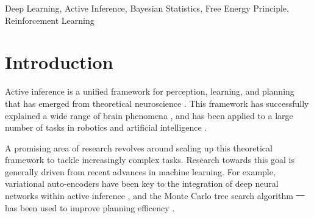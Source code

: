 \documentclass[twoside,11pt]{article}
\providecommand{\DIFadd}[1]{{\protect\color{blue}\uwave{#1}}} %
\providecommand{\DIFdel}[1]{{\protect\color{red}\sout{#1}}}                      %
\providecommand{\DIFaddbegin}{} %
\providecommand{\DIFaddend}{} %
\providecommand{\DIFdelbegin}{} %
\providecommand{\DIFdelend}{} %
\begin{document}
\begin{keywords}
Deep Learning, Active Inference, Bayesian Statistics, Free Energy Principle, Reinforcement Learning
\end{keywords}

\section{Introduction}

Active inference is a unified framework for perception, learning, and planning that has emerged from theoretical neuroscience \citep{AI_TUTO,AI_VMP,AITs_tHEORY,
AITS_PRACTICE,BTAI_BF}. This framework has successfully explained a wide range of brain phenomena  \citep{FRISTON2016862,bayes_surprise,curiosity,dopamine}, and has been applied to a large number of tasks in robotics and artificial intelligence \citep{DeepAIwithMCMC,pezzato2020active,
sancaktar2020endtoend,ccatal2020learning,CULLEN2018809,cart_pole}.

A promising area of research revolves around scaling up this theoretical framework to tackle increasingly complex tasks. Research towards this goal is generally driven from recent advances in machine learning. For example, variational auto-encoders \citep{VAE,beta-VAE} have been key to the integration of deep neural networks within active inference \citep{sancaktar2020endtoend,ccatal2020learning,DeepAI}, and the Monte Carlo tree search algorithm \DIFdelbegin \DIFdel{\mbox{%
\citep{6145622,Go} }\hspace{0pt}%
}\DIFdelend \DIFaddbegin \DIFadd{\mbox{%
\citep{MCTS,Go} }\hspace{0pt}%
}\DIFaddend has been used to improve planning efficency \citep{DeepAIwithMCMC,AITs_tHEORY,
AITS_PRACTICE,BTAI_BF,BTAI_3MF}.
\end{document}

